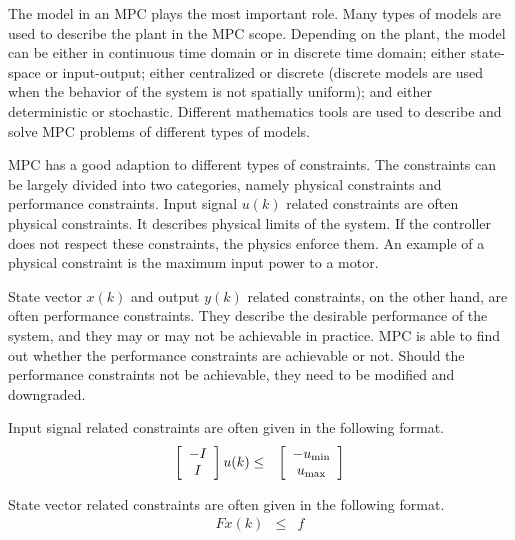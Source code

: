 The model in an MPC plays the most important role. Many types of models are used to describe the plant in the MPC scope. Depending on the plant, the model can be either in continuous time domain or in discrete time domain; either state-space or input-output; either centralized or discrete (discrete models are used when the behavior of the system is not spatially uniform); and either deterministic or stochastic. Different mathematics tools are used to describe and solve MPC problems of different types of models.

MPC has a good adaption to different types of constraints. The constraints can be largely divided into two categories, namely physical constraints and performance constraints. Input signal $u(k)$ related constraints are often physical constraints. It describes physical limits of the system. If the controller does not respect these constraints, the physics enforce them. An example of a physical constraint is the maximum input power to a motor.

State vector $x(k)$ and output $y(k)$ related constraints, on the other hand, are often performance constraints. They describe the desirable performance of the system, and they may or may not be achievable in practice. MPC is able to find out whether the performance constraints are achievable or not. Should the performance constraints not be achievable, they need to be modified and downgraded.

Input signal related constraints are often given in the following format.
\begin{eqnarray}
	\left[\begin{array}{c}
		-I \\ I
	\end{array}\right]u(k) &\leq& \left[\begin{array}{c}
	-u_{\textup{min}} \\ u_{\textup{max}}
\end{array}\right] \nonumber
\end{eqnarray}

State vector related constraints are often given in the following format.
\begin{eqnarray}
	Fx(k) &\leq& f \nonumber
\end{eqnarray}

